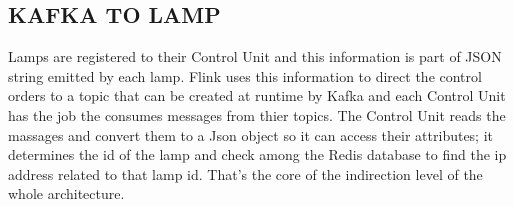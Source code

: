 \subsection{KAFKA TO LAMP}
Lamps are registered to their Control Unit and this information is part of JSON string emitted by each lamp. Flink uses this information to direct the control orders to a topic that can be created at runtime by Kafka and each Control Unit has the job the consumes messages from thier topics. The Control Unit reads the massages and convert them to a Json object so it can access their attributes; it determines the id of the lamp and check among the Redis database to find the ip address related to that lamp id. That’s the core of the indirection level of the whole architecture.

